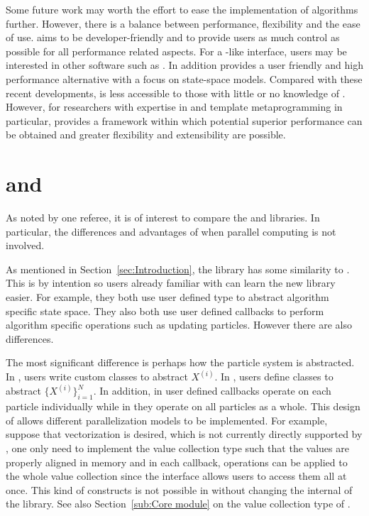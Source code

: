 \documentclass[11pt, fontset=Minion, showoverfull,
bib, mintcode, minted=cache]{marticle}
\begin{document}
Some future work may worth the effort to ease the implementation of \smc
algorithms further. However, there is a balance between performance,
flexibility and the ease of use. \vsmc aims to be developer-friendly and to
provide users as much control as possible for all performance related aspects.
For a \bugs-like interface, users may be interested in other software such as
\biips \parencite{BiiPS}. In addition \libbi \parencite{Murray2013bi} provides
a user friendly and high performance alternative with a focus on state-space
models. Compared with these recent developments, \vsmc is less accessible to
those with little or no knowledge of \cpp. However, for researchers with
expertise in \cpp and template metaprogramming in particular, \vsmc provides a
framework within which potential superior performance can be obtained and
greater flexibility and extensibility are possible.

\clearpage
\appendix

\section[vsmc and smctc]{\protect\vsmc and \protect\smctc}
\label{sec:vsmc and smctc}

As noted by one referee, it is of interest to compare the \vsmc and \smctc
libraries. In particular, the differences and advantages of \vsmc when
parallel computing is not involved.

As mentioned in Section~\ref{sec:Introduction}, the \vsmc library has some
similarity to \smctc. This is by intention so users already familiar with
\smctc can learn the new library easier. For example, they both use user
defined type to abstract algorithm specific state space. They also both use
user defined callbacks to perform algorithm specific operations such as
updating particles. However there are also differences.

The most significant difference is perhaps how the particle system is
abstracted. In \smctc, users write custom classes to abstract $X^{(i)}$. In
\vsmc, users define classes to abstract $\{X^{(i)}\}_{i=1}^N$. In addition, in
\smctc user defined callbacks operate on each particle individually while in
\vsmc they operate on all particles as a whole. This design of \vsmc allows
different parallelization models to be implemented. For example, suppose that
\simd vectorization is desired, which is not currently directly supported by
\vsmc, one only need to implement the value collection type such that the
values are properly aligned in memory and in each callback, \simd operations
can be applied to the whole value collection since the \vsmc interface allows
users to access them all at once. This kind of constructs is not possible in
\smctc without changing the internal of the library. See also
Section~\ref{sub:Core module} on the value collection type of \vsmc.
\end{document}
